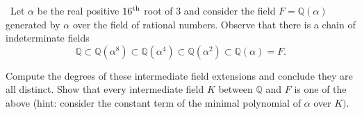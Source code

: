 \documentclass[12pt]{Qual}
\begin{document}
\newpage




\begin{problem} $\,$
Let $\alpha$ be the real positive $16^\text{th}$ root of $3$ and consider the field $F=\mathbb{Q}(\alpha)$ generated by $\alpha$ over the field of rational numbers. Observe that there is a chain of indeterminate fields $$\mathbb{Q}\subset\mathbb{Q}(\alpha^8)\subset\mathbb{Q}(\alpha^4)\subset\mathbb{Q}(\alpha^2)\subset\mathbb{Q}(\alpha)=F.$$

Compute the degrees of these intermediate field extensions and conclude they are all distinct. Show that every intermediate field $K$ between $\mathbb{Q}$ and $F$ is one of the above (hint: consider the constant term of the minimal polynomial of $\alpha$ over $K).$
\end{problem}
\end{document}

